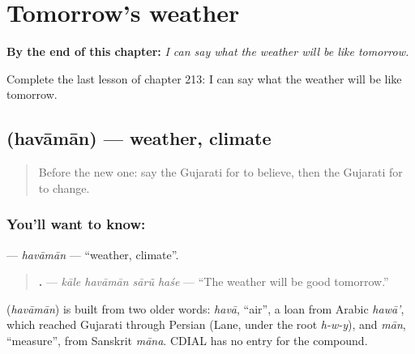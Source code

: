 
\chapter{Tomorrow's weather}
\label{ch:gu-tomorrow-s-weather}

\begin{chapteropening}
\textbf{By the end of this chapter:} \emph{I can say what the weather will be like tomorrow.}

Complete the last lesson of chapter 213: I can say what the weather will be like tomorrow.
\end{chapteropening}

\section[\texorpdfstring{\gu{હવામાન} (havāmān)}{હવામાન (havāmān)}]{ (havāmān) — weather, climate}

\label{lesson:GU-C213-havaman}



\begin{quote}
Before the new one: say the Gujarati for to believe, then the Gujarati for to change.
\end{quote}

\subsection*{You'll want to know: }
\textbf{} — \emph{havāmān} — \textquotedblleft{}weather, climate\textquotedblright{}.

\begin{quote}
\textbf{   .} — \emph{kāle havāmān sārũ haśe} — \textquotedblleft{}The weather will be good tomorrow.\textquotedblright{}
\end{quote}

\begin{cousinweb}
\textbf{} (\emph{havāmān}) is built from two older words: \emph{havā}, \textquotedblleft{}air\textquotedblright{}, a loan from Arabic \emph{hawā'}, which reached Gujarati through Persian (Lane, under the root \emph{h-w-y}), and \emph{mān}, \textquotedblleft{}measure\textquotedblright{}, from Sanskrit \emph{māna}. CDIAL has no entry for the compound.
\end{cousinweb}

